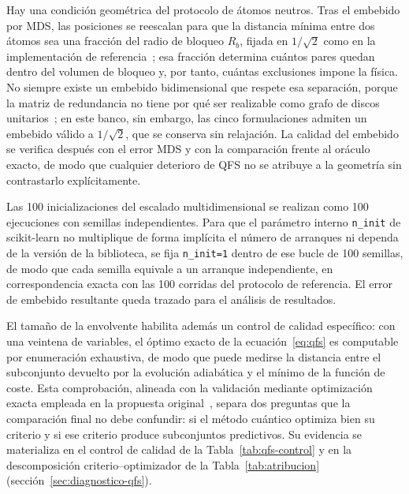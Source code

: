 Hay una condición geométrica del protocolo de átomos neutros. Tras el
embebido por MDS, las posiciones se reescalan para que la distancia
mínima entre dos átomos sea una fracción del radio de bloqueo $R_b$,
fijada en $1/\sqrt{2}$ como en la implementación de
referencia~\cite{orquin2026}; esa fracción determina cuántos pares
quedan dentro del volumen de bloqueo y, por tanto, cuántas exclusiones
impone la física. No siempre existe un embebido bidimensional que
respete esa separación, porque la matriz de redundancia no tiene por qué
ser realizable como grafo de discos unitarios~\cite{nguyen2023,
bermot2025}; en este banco, sin embargo, las cinco formulaciones
admiten un embebido válido a $1/\sqrt{2}$, que se conserva sin
relajación. La calidad del embebido se verifica después con el error MDS y
con la comparación frente al oráculo exacto, de modo que cualquier
deterioro de QFS no se atribuye a la geometría sin contrastarlo
explícitamente.

Las 100 inicializaciones del escalado multidimensional se realizan como
100 ejecuciones con semillas independientes. Para que el parámetro
interno \texttt{n\_init} de scikit-learn no multiplique de forma
implícita el número de arranques ni dependa de la versión de la
biblioteca, se fija \texttt{n\_init=1} dentro de ese bucle de 100
semillas, de modo que cada semilla equivale a un arranque independiente,
en correspondencia exacta con las 100 corridas del protocolo de
referencia. El error de embebido resultante queda trazado para el
análisis de resultados.

El tamaño de la envolvente habilita además un control de calidad
específico: con una veintena de variables, el óptimo exacto de la
ecuación~\ref{eq:qfs} es computable por enumeración exhaustiva, de
modo que puede medirse la distancia entre el subconjunto devuelto por
la evolución adiabática y el mínimo de la función de coste. Esta
comprobación, alineada con la validación mediante optimización exacta
empleada en la propuesta original~\cite{orquin2026}, separa dos
preguntas que la comparación final no debe confundir: si el método
cuántico optimiza bien su criterio y si ese criterio produce
subconjuntos predictivos. Su evidencia se materializa en el control de
calidad de la Tabla~\ref{tab:qfs-control} y en la descomposición
criterio--optimizador de la Tabla~\ref{tab:atribucion}
(sección~\ref{sec:diagnostico-qfs}).

